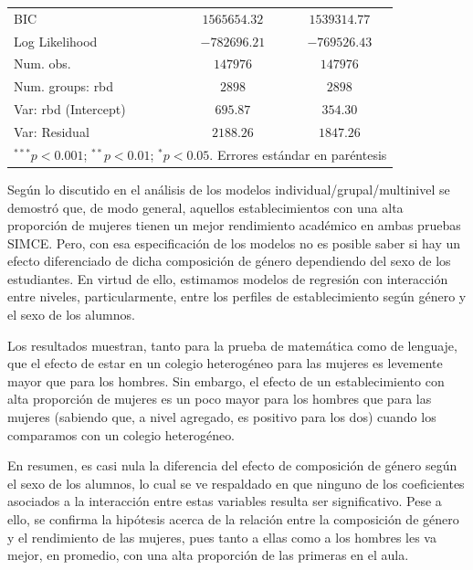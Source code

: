 \documentclass[
]{article}
\begin{document}
\begin{table}
\begin{center}
\begin{tabular}{l c c}
BIC                              & $1565654.32$   & $1539314.77$   \\
Log Likelihood                   & $-782696.21$   & $-769526.43$   \\
Num. obs.                        & $147976$       & $147976$       \\
Num. groups: rbd                 & $2898$         & $2898$         \\
Var: rbd (Intercept)             & $695.87$       & $354.30$       \\
Var: Residual                    & $2188.26$      & $1847.26$      \\
\hline
\multicolumn{3}{l}{\scriptsize{$^{***}p<0.001$; $^{**}p<0.01$; $^{*}p<0.05$. Errores estándar en paréntesis}}
\end{tabular}
\label{table:coefficients}
\end{center}
\end{table}

Según lo discutido en el análisis de los modelos
individual/grupal/multinivel se demostró que, de modo general, aquellos
establecimientos con una alta proporción de mujeres tienen un mejor
rendimiento académico en ambas pruebas SIMCE. Pero, con esa
especificación de los modelos no es posible saber si hay un efecto
diferenciado de dicha composición de género dependiendo del sexo de los
estudiantes. En virtud de ello, estimamos modelos de regresión con
interacción entre niveles, particularmente, entre los perfiles de
establecimiento según género y el sexo de los alumnos.

Los resultados muestran, tanto para la prueba de matemática como de
lenguaje, que el efecto de estar en un colegio heterogéneo para las
mujeres es levemente mayor que para los hombres. Sin embargo, el efecto
de un establecimiento con alta proporción de mujeres es un poco mayor
para los hombres que para las mujeres (sabiendo que, a nivel agregado,
es positivo para los dos) cuando los comparamos con un colegio
heterogéneo.

En resumen, es casi nula la diferencia del efecto de composición de
género según el sexo de los alumnos, lo cual se ve respaldado en que
ninguno de los coeficientes asociados a la interacción entre estas
variables resulta ser significativo. Pese a ello, se confirma la
hipótesis acerca de la relación entre la composición de género y el
rendimiento de las mujeres, pues tanto a ellas como a los hombres les va
mejor, en promedio, con una alta proporción de las primeras en el aula.
\end{document}
